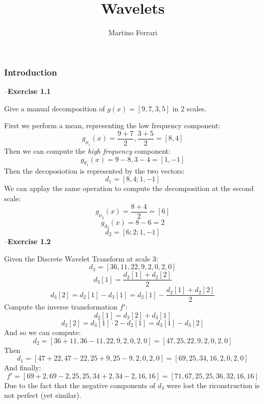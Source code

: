 \documentclass{letter}
\newcommand{\paragraph}[1]{\smallskip--\noindent\textbf{#1}}
\newcommand{\tmem}[1]{{\em #1\/}}
\begin{document}
\title{Wavelets}

\author{Martino Ferrari}

\maketitle

\subsubsection{Introduction}\label{introduction}

\paragraph{Exercise 1.1}\label{exercise-1.1}

Give a manual decomposition of $g (x) = [9, 7, 3, 5]$ in 2 scales.

First we perform a mean, representing the low frequency component:
\[ g_{\mu_1} (x) = \frac{9 + 7}{2}, \frac{3 + 5}{2} = [8, 4] \]
Then we can compute the {\tmem{high frequency}} component:
\[ g_{d_1} (x) = 9 - 8, 3 - 4 = [1, - 1] \]
Then the decoposiotion is represented by the two vectors:
\[ d_1 = [8, 4 ; 1, - 1] \]
We can applay the same operation to compute the decomposition at the second
scale:
\[ g_{\mu_2} (x) = \frac{8 + 4}{2} = [6] \]
\[ g_{d_2} (x) = 8 - 6 = 2 \]
\[ d_2 = [6 ; 2 ; 1, - 1] \]
\paragraph{Exercise 1.2}\label{exercise-1.2}

Given the Discrete Wavelet Transform at scale 3:
\[ d_3 = [36, 11, 22, 9, 2, 0, 2, 0] \]
\[ d_3 [1] = \frac{d_2 [1] + d_2 [2]}{2} \]
\[ d_3 [2] = d_2 [1] - d_3 [1] = d_2 [1] - \frac{d_2 [1] + d_2 [2]}{2} \]
Compute the inverse transformation $f'$:
\[ d_2 [1] = d_3 [2] + d_3 [1] \]
\[ d_2 [2] = d_3 [1] \cdot 2 - d_2 [1] = d_3 [1] - d_3 [2] \]
And so we can compute:
\[ d_2 = [36 + 11, 36 - 11, 22, 9, 2, 0, 2, 0] = [47, 25, 22, 9, 2, 0, 2, 0]
\]
Then
\[ d_1 = [47 + 22, 47 - 22, 25 + 9, 25 - 9, 2, 0, 2, 0] = [69, 25, 34, 16, 2,
   0, 2, 0] \]
And finally:
\[ f' = [69 + 2, 69 - 2, 25, 25, 34 + 2, 34 - 2, 16, 16] = [71, 67, 25, 25,
   36, 32, 16, 16] \]
Due to the fact that the negative components of $d_3$ were lost the
riconstruction is not perfect (yet similar).
\end{document}
